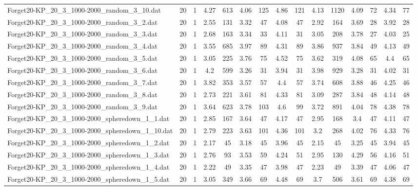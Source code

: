 \begin{table}[!ht]
{\begin{tabular}{lcccccccccccccc}
Forget20-KP\_20\_3\_1000-2000\_random\_3\_10.dat & 20 & 1 & 4.27 & 613 & 4.06 & 125 & 4.86 & 121 & 4.13 & 1120 & 4.09 & 72 & 4.34 & 77 \\
Forget20-KP\_20\_3\_1000-2000\_random\_3\_2.dat & 20 & 1 & 2.55 & 131 & 3.32 & 47 & 4.08 & 47 & 2.92 & 164 & 3.69 & 28 & 3.92 & 28 \\
Forget20-KP\_20\_3\_1000-2000\_random\_3\_3.dat & 20 & 1 & 2.68 & 163 & 3.34 & 33 & 4.11 & 31 & 3.05 & 208 & 3.78 & 27 & 4.03 & 25 \\
Forget20-KP\_20\_3\_1000-2000\_random\_3\_4.dat & 20 & 1 & 3.55 & 685 & 3.97 & 89 & 4.31 & 89 & 3.86 & 937 & 3.84 & 49 & 4.13 & 49 \\
Forget20-KP\_20\_3\_1000-2000\_random\_3\_5.dat & 20 & 1 & 3.05 & 225 & 3.76 & 75 & 4.52 & 75 & 3.62 & 319 & 4.08 & 65 & 4.4 & 65 \\
Forget20-KP\_20\_3\_1000-2000\_random\_3\_6.dat & 20 & 1 & 4.2 & 599 & 3.26 & 31 & 3.94 & 31 & 3.98 & 929 & 3.28 & 31 & 4.02 & 31 \\
Forget20-KP\_20\_3\_1000-2000\_random\_3\_7.dat & 20 & 1 & 3.82 & 353 & 3.57 & 57 & 4.4 & 57 & 3.74 & 608 & 3.88 & 46 & 4.25 & 46 \\
Forget20-KP\_20\_3\_1000-2000\_random\_3\_8.dat & 20 & 1 & 2.73 & 221 & 3.61 & 81 & 4.33 & 81 & 3.09 & 287 & 3.84 & 48 & 4.14 & 48 \\
Forget20-KP\_20\_3\_1000-2000\_random\_3\_9.dat & 20 & 1 & 3.64 & 623 & 3.78 & 103 & 4.6 & 99 & 3.72 & 891 & 4.04 & 78 & 4.38 & 78 \\
Forget20-KP\_20\_3\_1000-2000\_spheredown\_1\_1.dat & 20 & 1 & 2.85 & 167 & 3.64 & 47 & 4.17 & 47 & 2.95 & 168 & 3.4 & 47 & 4.11 & 47 \\
Forget20-KP\_20\_3\_1000-2000\_spheredown\_1\_10.dat & 20 & 1 & 2.79 & 223 & 3.63 & 101 & 4.36 & 101 & 3.2 & 268 & 4.02 & 76 & 4.33 & 76 \\
Forget20-KP\_20\_3\_1000-2000\_spheredown\_1\_2.dat & 20 & 1 & 2.17 & 45 & 3.18 & 45 & 3.96 & 45 & 2.15 & 45 & 3.25 & 45 & 3.94 & 45 \\
Forget20-KP\_20\_3\_1000-2000\_spheredown\_1\_3.dat & 20 & 1 & 2.76 & 93 & 3.53 & 59 & 4.24 & 51 & 2.95 & 130 & 4.29 & 56 & 4.16 & 51 \\
Forget20-KP\_20\_3\_1000-2000\_spheredown\_1\_4.dat & 20 & 1 & 2.22 & 49 & 3.35 & 47 & 3.98 & 47 & 2.23 & 49 & 3.39 & 47 & 4.06 & 47 \\
Forget20-KP\_20\_3\_1000-2000\_spheredown\_1\_5.dat & 20 & 1 & 3.05 & 349 & 3.66 & 69 & 4.48 & 69 & 3.7 & 506 & 3.61 & 69 & 4.38 & 69 \\

\end{tabular}}
\end{table}
